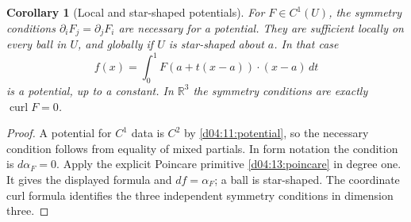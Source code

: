 \documentclass[11pt,oneside,openany]{book}
\newtheorem{corollary}[theorem]{Corollary}
\theoremstyle{definition}
\theoremstyle{remark}
\newcommand{\R}{\mathbb R}
\begin{document}
\begin{corollary}[Local and star-shaped potentials]\label{d04:11:local-potential}
For $F\in C^1(U)$, the symmetry conditions
$\partial_iF_j=\partial_jF_i$ are necessary for a potential. They are
sufficient locally on every ball in $U$, and globally if $U$ is star-shaped
about $a$. In that case
\[
 f(x)=\int_0^1F(a+t(x-a))\cdot(x-a)\,dt
\]
is a potential, up to a constant. In $\R^3$ the symmetry conditions are
exactly $\operatorname{curl}F=0$.
\end{corollary}
\begin{proof}
A potential for $C^1$ data is $C^2$ by \cref{d04:11:potential}, so the
necessary condition follows from equality of mixed partials. In form
notation the condition is $d\alpha_F=0$. Apply the explicit Poincare
primitive \cref{d04:13:poincare} in degree one. It gives the displayed
formula and $df=\alpha_F$; a ball is star-shaped. The coordinate curl
formula identifies the three independent symmetry conditions in dimension
three.
\end{proof}
\end{document}
